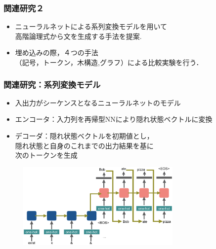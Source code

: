 \documentclass[dvipdfmx,cjk]{beamer}
\begin{document}
\begin{frame}
\frametitle{関連研究２}
\begin{center}
\end{center}
\begin{block}{}
  \begin{itemize}
    \item {\color{berry}ニューラルネットによる系列変換モデル}を用いて\\高階論理式から文を生成する手法を提案.
    \item 埋め込みの際，４つの手法\\（記号，トークン，木構造,グラフ）による比較実験を行う．
  \end{itemize}
\end{block}

\end{frame}



\begin{frame}
\frametitle{関連研究：系列変換モデル }
\begin{itemize}
  \item 入出力がシーケンスとなるニューラルネットのモデル
  \item エンコータ：入力列を再帰型NNにより隠れ状態ベクトルに変換
  \item デコーダ：隠れ状態ベクトルを初期値とし，\\隠れ状態と自身のこれまでの出力結果を基に\\次のトークンを生成
\end{itemize}

\begin{center}
\begin{figure}[h]
	\includegraphics[width=8cm]{learn_model.png}
        \label{fig:seq2seq}
\end{figure}
\end{center}

\end{frame}
\end{document}

